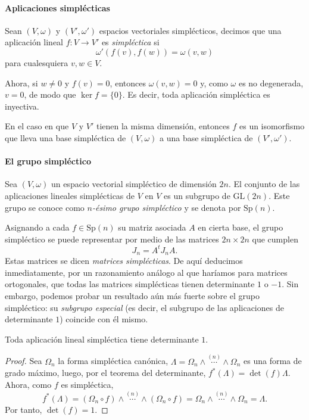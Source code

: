 \paragraph{\bf Aplicaciones simplécticas}\mbox{}

  Sean $(V,\omega)$ y $(V',\omega')$ espacios vectoriales simplécticos, decimos que una aplicación lineal $f:V \rightarrow V'$ es \emph{simpléctica} si
  \[
    \omega'(f(v),f(w)) = \omega(v,w)
  \]
  para cualesquiera $v,w \in V$.

Ahora, si $w\neq 0$ y $f(v)=0$, entonces $\omega(v,w)=0$ y, como $\omega$ es no degenerada, $v=0$, de modo que $\ker f=\{0\}$. Es decir, toda aplicación simpléctica es inyectiva.

En el caso en que $V$ y $V'$ tienen la misma dimensión, entonces $f$ es un isomorfismo que lleva una base simpléctica de $(V,\omega)$ a una base simpléctica de $(V',\omega')$. 

\paragraph{\bf El grupo simpléctico}\mbox{}

  Sea $(V,\omega)$ un espacio vectorial simpléctico de dimensión $2n$. El conjunto de las aplicaciones lineales simplécticas de $V$ en $V$ es un subgrupo de $\mathrm{GL}(2n)$. Este grupo se conoce como \emph{$n$-ésimo grupo simpléctico} y se denota por $\mathrm{Sp}(n)$.

  Asignando a cada $f\in \mathrm{Sp}(n)$ su matriz asociada $A$ en cierta base, el grupo simpléctico se puede representar por medio de las matrices $2n\times 2n$ que cumplen
  \begin{equation*}
    J_n=A^tJ_n A.
  \end{equation*}
  Estas matrices se dicen \emph{matrices simplécticas}.
  De aquí deducimos inmediatamente, por un razonamiento análogo al que haríamos para matrices ortogonales, que todas las matrices simplécticas tienen determinante $1$ o $-1$. Sin embargo, podemos probar un resultado aún más fuerte sobre el grupo simpléctico: su \emph{subgrupo especial} (es decir, el subgrupo de las aplicaciones de determinante $1$) coincide con él mismo.
\begin{prop}
  Toda aplicación lineal simpléctica tiene determinante $1$.
\end{prop}
\begin{proof}
  Sea $\Omega_n$ la forma simpléctica canónica, $\Lambda=\Omega_n \wedge \overset{(n)}{\cdots} \wedge \Omega_n$ es una forma de grado máximo, luego, por el teorema del determinante, $f^*(\Lambda)=\det(f) \Lambda$. Ahora, como $f$ es simpléctica, 
  \begin{equation*}
    f^*(\Lambda) = (\Omega_n \circ f) \wedge \overset{(n)}{\cdots} \wedge (\Omega_n \circ f)=\Omega_n \wedge \overset{(n)}{\cdots} \wedge \Omega_n = \Lambda.
  \end{equation*}
  Por tanto, $\det(f)=1$.
\end{proof}
